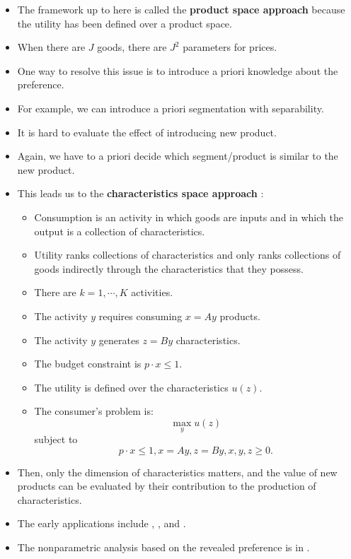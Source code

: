 \documentclass[
]{book}
\providecommand{\tightlist}{%
  \setlength{\itemsep}{0pt}\setlength{\parskip}{0pt}}
\begin{document}
\begin{itemize}
\tightlist
\item
  The framework up to here is called the \textbf{product space approach} because the utility has been defined over a product space.
\item
  When there are \(J\) goods, there are \(J^2\) parameters for prices.
\item
  One way to resolve this issue is to introduce a priori knowledge about the preference.
\item
  For example, we can introduce a priori segmentation with separability.
\item
  It is hard to evaluate the effect of introducing new product.
\item
  Again, we have to a priori decide which segment/product is similar to the new product.
\item
  This leads us to the \textbf{characteristics space approach} \citep{Lancaster1966, Muth1966}:

  \begin{itemize}
  \tightlist
  \item
    Consumption is an activity in which goods are inputs and in which the output is a collection of characteristics.
  \item
    Utility ranks collections of characteristics and only ranks collections of goods indirectly through the characteristics that they possess.
  \item
    There are \(k = 1, \cdots, K\) activities.
  \item
    The activity \(y\) requires consuming \(x = A y\) products.
  \item
    The activity \(y\) generates \(z = B y\) characteristics.
  \item
    The budget constraint is \(p \cdot x \le 1\).
  \item
    The utility is defined over the characteristics \(u(z)\).
  \item
    The consumer's problem is:
    \[
      \max_y u(z)
      \]
    subject to
    \[
      p \cdot x \le 1, x = Ay, z = By, x, y, z \ge 0.
      \]
  \end{itemize}
\item
  Then, only the dimension of characteristics matters, and the value of new products can be evaluated by their contribution to the production of characteristics.
\item
  The early applications include \citet{Rosen1974}, \citet{Muellbauer1974}, and \citet{Gorman1980}.
\item
  The nonparametric analysis based on the revealed preference is in \citet{Blow2008}.
\end{itemize}
\end{document}
